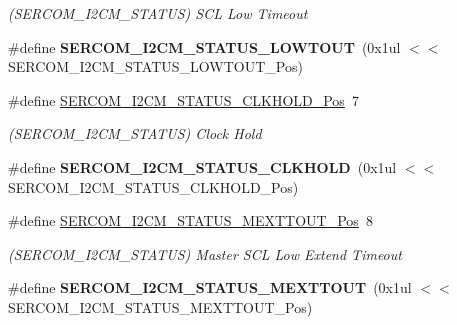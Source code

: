 \begin{DoxyCompactItemize}
\begin{DoxyCompactList}\small\item\em (S\+E\+R\+C\+O\+M\+\_\+\+I2\+C\+M\+\_\+\+S\+T\+A\+T\+U\+S) S\+C\+L Low Timeout \end{DoxyCompactList}\item 
\hypertarget{group___s_a_m_l21___s_e_r_c_o_m_ga8868c9c040d485e34692c0ec845b0a52}{}\#define {\bfseries S\+E\+R\+C\+O\+M\+\_\+\+I2\+C\+M\+\_\+\+S\+T\+A\+T\+U\+S\+\_\+\+L\+O\+W\+T\+O\+U\+T}~(0x1ul $<$$<$ S\+E\+R\+C\+O\+M\+\_\+\+I2\+C\+M\+\_\+\+S\+T\+A\+T\+U\+S\+\_\+\+L\+O\+W\+T\+O\+U\+T\+\_\+\+Pos)\label{group___s_a_m_l21___s_e_r_c_o_m_ga8868c9c040d485e34692c0ec845b0a52}

\item 
\hypertarget{group___s_a_m_l21___s_e_r_c_o_m_ga09c0431b1d323ff018f83a4e978fcb57}{}\#define \hyperlink{group___s_a_m_l21___s_e_r_c_o_m_ga09c0431b1d323ff018f83a4e978fcb57}{S\+E\+R\+C\+O\+M\+\_\+\+I2\+C\+M\+\_\+\+S\+T\+A\+T\+U\+S\+\_\+\+C\+L\+K\+H\+O\+L\+D\+\_\+\+Pos}~7\label{group___s_a_m_l21___s_e_r_c_o_m_ga09c0431b1d323ff018f83a4e978fcb57}

\begin{DoxyCompactList}\small\item\em (S\+E\+R\+C\+O\+M\+\_\+\+I2\+C\+M\+\_\+\+S\+T\+A\+T\+U\+S) Clock Hold \end{DoxyCompactList}\item 
\hypertarget{group___s_a_m_l21___s_e_r_c_o_m_ga8d0560721d1443f09c55d3015e78160a}{}\#define {\bfseries S\+E\+R\+C\+O\+M\+\_\+\+I2\+C\+M\+\_\+\+S\+T\+A\+T\+U\+S\+\_\+\+C\+L\+K\+H\+O\+L\+D}~(0x1ul $<$$<$ S\+E\+R\+C\+O\+M\+\_\+\+I2\+C\+M\+\_\+\+S\+T\+A\+T\+U\+S\+\_\+\+C\+L\+K\+H\+O\+L\+D\+\_\+\+Pos)\label{group___s_a_m_l21___s_e_r_c_o_m_ga8d0560721d1443f09c55d3015e78160a}

\item 
\hypertarget{group___s_a_m_l21___s_e_r_c_o_m_gad70ca5b70751e364470a3819a1c8de65}{}\#define \hyperlink{group___s_a_m_l21___s_e_r_c_o_m_gad70ca5b70751e364470a3819a1c8de65}{S\+E\+R\+C\+O\+M\+\_\+\+I2\+C\+M\+\_\+\+S\+T\+A\+T\+U\+S\+\_\+\+M\+E\+X\+T\+T\+O\+U\+T\+\_\+\+Pos}~8\label{group___s_a_m_l21___s_e_r_c_o_m_gad70ca5b70751e364470a3819a1c8de65}

\begin{DoxyCompactList}\small\item\em (S\+E\+R\+C\+O\+M\+\_\+\+I2\+C\+M\+\_\+\+S\+T\+A\+T\+U\+S) Master S\+C\+L Low Extend Timeout \end{DoxyCompactList}\item 
\hypertarget{group___s_a_m_l21___s_e_r_c_o_m_ga4b1e0c0bae122ee71a0f0b8f35e79673}{}\#define {\bfseries S\+E\+R\+C\+O\+M\+\_\+\+I2\+C\+M\+\_\+\+S\+T\+A\+T\+U\+S\+\_\+\+M\+E\+X\+T\+T\+O\+U\+T}~(0x1ul $<$$<$ S\+E\+R\+C\+O\+M\+\_\+\+I2\+C\+M\+\_\+\+S\+T\+A\+T\+U\+S\+\_\+\+M\+E\+X\+T\+T\+O\+U\+T\+\_\+\+Pos)\label{group___s_a_m_l21___s_e_r_c_o_m_ga4b1e0c0bae122ee71a0f0b8f35e79673}


\end{DoxyCompactItemize}
